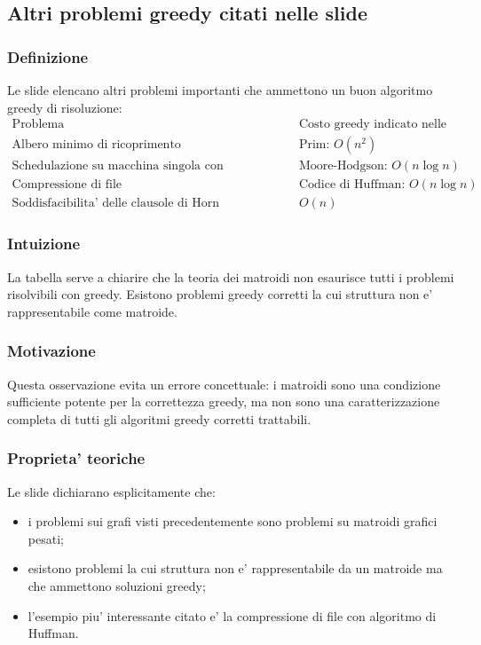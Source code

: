 \subsection{Altri problemi greedy citati nelle slide}

\subsubsection{Definizione}
Le slide elencano altri problemi importanti che ammettono un buon algoritmo greedy di risoluzione:
\[
\begin{array}{c|c}
\text{Problema} & \text{Costo greedy indicato nelle slide} \\
\hline
\text{Albero minimo di ricoprimento} & \text{Prim: } O(n^2) \\
\text{Schedulazione su macchina singola con minimizzazione del numero di attivita' in ritardo} & \text{Moore-Hodgson: } O(n\log n) \\
\text{Compressione di file} & \text{Codice di Huffman: } O(n\log n) \\
\text{Soddisfacibilita' delle clausole di Horn} & O(n)
\end{array}
\]

\subsubsection{Intuizione}
La tabella serve a chiarire che la teoria dei matroidi non esaurisce tutti i problemi risolvibili con greedy. Esistono problemi greedy corretti la cui struttura non e' rappresentabile come matroide.

\subsubsection{Motivazione}
Questa osservazione evita un errore concettuale: i matroidi sono una condizione sufficiente potente per la correttezza greedy, ma non sono una caratterizzazione completa di tutti gli algoritmi greedy corretti trattabili.

\subsubsection{Proprieta' teoriche}
Le slide dichiarano esplicitamente che:
\begin{itemize}
	\item i problemi sui grafi visti precedentemente sono problemi su matroidi grafici pesati;
	\item esistono problemi la cui struttura non e' rappresentabile da un matroide ma che ammettono soluzioni greedy;
	\item l'esempio piu' interessante citato e' la compressione di file con algoritmo di Huffman.
\end{itemize}

